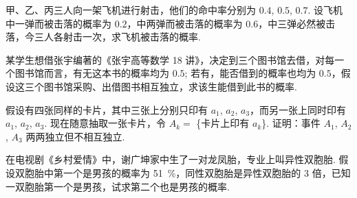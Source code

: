 	\begin{titwo}
		甲、乙、丙三人向一架飞机进行射击，他们的命中率分别为 $0.4$, $0.5$, $0.7$. 设飞机中一弹而被击落的概率为 $0.2$，中两弹而被击落的概率为 $0.6$，中三弹必然被击落，今三人各射击一次，求飞机被击落的概率.
	\end{titwo}

	\begin{titwo}
		某学生想借张宇编著的《张宇高等数学 18 讲》，决定到三个图书馆去借，对每一个图书馆而言，有无这本书的概率均为 $0.5$; 若有，能否借到的概率也均为 $0.5$，假设这三个图书馆采购、出借图书相互独立，求该生能借到此书的概率.
	\end{titwo}

	\begin{titwo}
		假设有四张同样的卡片，其中三张上分别只印有 $a_{1}$, $a_{2}$, $a_{3}$，而另一张上同时印有 $a_{1}$, $a_{2}$, $a_{3}$. 现在随意抽取一张卡片，令 $A_{k} = $ \{卡片上印有 $a_{k}$\}. 证明：事件 $A_{1}$, $A_{2}$, $A_{3}$ 两两独立但不相互独立.
	\end{titwo}

	\begin{titwo}
		在电视剧《乡村爱情》中，谢广坤家中生了一对龙凤胎，专业上叫异性双胞胎. 假设双胞胎中第一个是男孩的概率为 \SI{51}{\percent}，同性双胞胎是异性双胞胎的 $3$ 倍，已知一双胞胎第一个是男孩，试求第二个也是男孩的概率.
	\end{titwo}